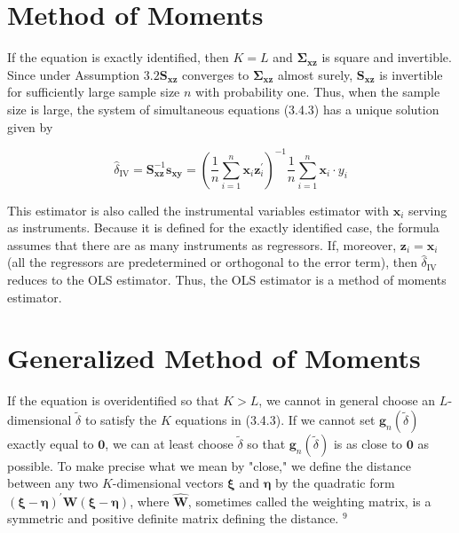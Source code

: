 \documentclass[10pt]{article}
\begin{document}
\section*{Method of Moments}
If the equation is exactly identified, then $K=L$ and $\mathbf{\Sigma}_{\mathbf{x z}}$ is square and invertible. Since under Assumption $3.2 \mathbf{S}_{\mathbf{x z}}$ converges to $\boldsymbol{\Sigma}_{\mathbf{x z}}$ almost surely, $\mathbf{S}_{\mathbf{x z}}$ is invertible for sufficiently large sample size $n$ with probability one. Thus, when the sample size is large, the system of simultaneous equations (3.4.3) has a unique solution given by


\begin{equation*}
\hat{\delta}_{\mathrm{IV}}=\mathbf{S}_{\mathbf{x z}}^{-1} \mathbf{s}_{\mathbf{x y}}=\left(\frac{1}{n} \sum_{i=1}^{n} \mathbf{x}_{i} \mathbf{z}_{i}^{\prime}\right)^{-1} \frac{1}{n} \sum_{i=1}^{n} \mathbf{x}_{i} \cdot y_{i} \tag{3.4.4}
\end{equation*}


This estimator is also called the instrumental variables estimator with $\mathbf{x}_{i}$ serving as instruments. Because it is defined for the exactly identified case, the formula assumes that there are as many instruments as regressors. If, moreover, $\mathbf{z}_{i}=\mathbf{x}_{i}$ (all the regressors are predetermined or orthogonal to the error term), then $\hat{\delta}_{\text {IV }}$ reduces to the OLS estimator. Thus, the OLS estimator is a method of moments estimator.

\section*{Generalized Method of Moments}
If the equation is overidentified so that $K>L$, we cannot in general choose an $L$-dimensional $\tilde{\delta}$ to satisfy the $K$ equations in (3.4.3). If we cannot set $\mathbf{g}_{n}(\tilde{\delta})$ exactly equal to $\mathbf{0}$, we can at least choose $\tilde{\delta}$ so that $\mathbf{g}_{n}(\tilde{\delta})$ is as close to $\mathbf{0}$ as possible. To make precise what we mean by "close," we define the distance between any two $K$-dimensional vectors $\boldsymbol{\xi}$ and $\boldsymbol{\eta}$ by the quadratic form $(\boldsymbol{\xi}-\boldsymbol{\eta})^{\prime} \widehat{\mathbf{W}}(\boldsymbol{\xi}-\boldsymbol{\eta})$, where $\widehat{\mathbf{W}}$, sometimes called the weighting matrix, is a symmetric and positive definite matrix defining the distance. ${ }^{9}$
\end{document}
